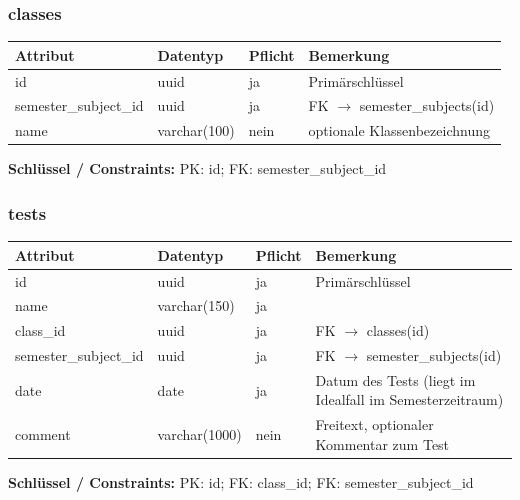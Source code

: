 \documentclass[12pt,a4paper]{article}
\begin{document}
    \subsubsection{classes}
    \begin{longtable}{|L{4cm}|L{3cm}|L{3cm}|L{4cm}|}
        \hline
        \textbf{Attribut} & \textbf{Datentyp} & \textbf{Pflicht} & \textbf{Bemerkung} \\ \hline
        id & uuid & ja & Primärschlüssel \\ \hline
        semester\_subject\_id & uuid & ja & FK $\rightarrow$ semester\_subjects(id) \\ \hline
        name & varchar(100) & nein & optionale Klassenbezeichnung \\ \hline
    \end{longtable}
    \textbf{Schlüssel / Constraints:} PK: id; FK: semester\_subject\_id

    \subsubsection{tests}
    \begin{longtable}{|L{4cm}|L{3cm}|L{3cm}|L{4cm}|}
        \hline
        \textbf{Attribut} & \textbf{Datentyp} & \textbf{Pflicht} & \textbf{Bemerkung} \\ \hline
        id & uuid & ja & Primärschlüssel \\ \hline
        name & varchar(150) & ja &  \\ \hline
        class\_id & uuid & ja & FK $\rightarrow$ classes(id) \\ \hline
        semester\_subject\_id & uuid & ja & FK $\rightarrow$ semester\_subjects(id) \\ \hline
        date & date & ja & Datum des Tests (liegt im Idealfall im Semesterzeitraum) \\ \hline
        comment & varchar(1000) & nein & Freitext, optionaler Kommentar zum Test \\ \hline
    \end{longtable}
    \textbf{Schlüssel / Constraints:} PK: id; FK: class\_id; FK: semester\_subject\_id
\end{document}

